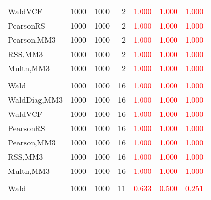 \documentclass[
]{article}
\begin{document}
\begin{table}[H]
{\begin{tabular}[t]{lrrrrrr}
\hspace{1em}WaldVCF & 1000 & 1000 & 2 & \textcolor{red}{1.000} & \textcolor{red}{1.000} & \textcolor{red}{1.000}\\
\hspace{1em}PearsonRS & 1000 & 1000 & 2 & \textcolor{red}{1.000} & \textcolor{red}{1.000} & \textcolor{red}{1.000}\\
\hspace{1em}Pearson,MM3 & 1000 & 1000 & 2 & \textcolor{red}{1.000} & \textcolor{red}{1.000} & \textcolor{red}{1.000}\\
\hspace{1em}RSS,MM3 & 1000 & 1000 & 2 & \textcolor{red}{1.000} & \textcolor{red}{1.000} & \textcolor{red}{1.000}\\
\hspace{1em}Multn,MM3 & 1000 & 1000 & 2 & \textcolor{red}{1.000} & \textcolor{red}{1.000} & \textcolor{red}{1.000}\\
\addlinespace[0.3em]
\multicolumn{7}{l}{\textbf{1F 15V}}\\
\hspace{1em}Wald & 1000 & 1000 & 16 & \textcolor{red}{1.000} & \textcolor{red}{1.000} & \textcolor{red}{1.000}\\
\hspace{1em}WaldDiag,MM3 & 1000 & 1000 & 16 & \textcolor{red}{1.000} & \textcolor{red}{1.000} & \textcolor{red}{1.000}\\
\hspace{1em}WaldVCF & 1000 & 1000 & 16 & \textcolor{red}{1.000} & \textcolor{red}{1.000} & \textcolor{red}{1.000}\\
\hspace{1em}PearsonRS & 1000 & 1000 & 16 & \textcolor{red}{1.000} & \textcolor{red}{1.000} & \textcolor{red}{1.000}\\
\hspace{1em}Pearson,MM3 & 1000 & 1000 & 16 & \textcolor{red}{1.000} & \textcolor{red}{1.000} & \textcolor{red}{1.000}\\
\hspace{1em}RSS,MM3 & 1000 & 1000 & 16 & \textcolor{red}{1.000} & \textcolor{red}{1.000} & \textcolor{red}{1.000}\\
\hspace{1em}Multn,MM3 & 1000 & 1000 & 16 & \textcolor{red}{1.000} & \textcolor{red}{1.000} & \textcolor{red}{1.000}\\
\addlinespace[0.3em]
\multicolumn{7}{l}{\textbf{2F 10V}}\\
\hspace{1em}Wald & 1000 & 1000 & 11 & \textcolor{red}{0.633} & \textcolor{red}{0.500} & \textcolor{red}{0.251}\\

\end{tabular}}
\end{table}
\end{document}
